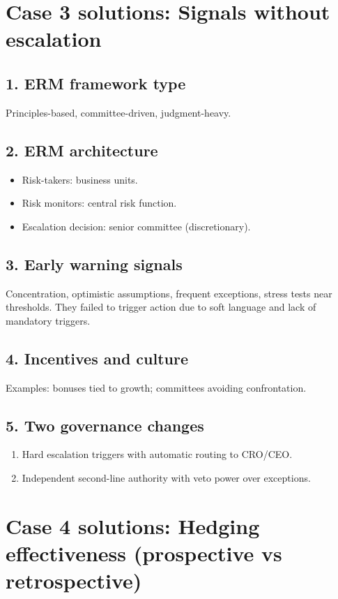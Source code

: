 \documentclass[11pt]{article}
\begin{document}
\newpage
\section{Case 3 solutions: Signals without escalation}
\subsection*{1. ERM framework type}
Principles-based, committee-driven, judgment-heavy.

\subsection*{2. ERM architecture}
\begin{itemize}
  \item Risk-takers: business units.
  \item Risk monitors: central risk function.
  \item Escalation decision: senior committee (discretionary).
\end{itemize}

\subsection*{3. Early warning signals}
Concentration, optimistic assumptions, frequent exceptions, stress tests near thresholds. They failed to trigger action due to soft language and lack of mandatory triggers.

\subsection*{4. Incentives and culture}
Examples: bonuses tied to growth; committees avoiding confrontation.

\subsection*{5. Two governance changes}
\begin{enumerate}
  \item Hard escalation triggers with automatic routing to CRO/CEO.
  \item Independent second-line authority with veto power over exceptions.
\end{enumerate}

\newpage
\section{Case 4 solutions: Hedging effectiveness (prospective vs retrospective)}
\end{document}
